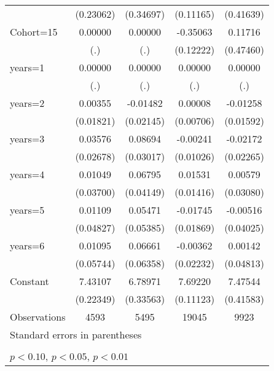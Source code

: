 \begin{table}[htbp]
\begin{tabular}{l*{4}{c}}
                    &   (0.23062)         &   (0.34697)         &   (0.11165)         &   (0.41639)         \\
\addlinespace
Cohort=15           &     0.00000         &     0.00000         &    -0.35063\sym{***}&     0.11716         \\
                    &         (.)         &         (.)         &   (0.12222)         &   (0.47460)         \\
\addlinespace
years=1             &     0.00000         &     0.00000         &     0.00000         &     0.00000         \\
                    &         (.)         &         (.)         &         (.)         &         (.)         \\
\addlinespace
years=2             &     0.00355         &    -0.01482         &     0.00008         &    -0.01258         \\
                    &   (0.01821)         &   (0.02145)         &   (0.00706)         &   (0.01592)         \\
\addlinespace
years=3             &     0.03576         &     0.08694\sym{***}&    -0.00241         &    -0.02172         \\
                    &   (0.02678)         &   (0.03017)         &   (0.01026)         &   (0.02265)         \\
\addlinespace
years=4             &     0.01049         &     0.06795         &     0.01531         &     0.00579         \\
                    &   (0.03700)         &   (0.04149)         &   (0.01416)         &   (0.03080)         \\
\addlinespace
years=5             &     0.01109         &     0.05471         &    -0.01745         &    -0.00516         \\
                    &   (0.04827)         &   (0.05385)         &   (0.01869)         &   (0.04025)         \\
\addlinespace
years=6             &     0.01095         &     0.06661         &    -0.00362         &     0.00142         \\
                    &   (0.05744)         &   (0.06358)         &   (0.02232)         &   (0.04813)         \\
\addlinespace
Constant            &     7.43107\sym{***}&     6.78971\sym{***}&     7.69220\sym{***}&     7.47544\sym{***}\\
                    &   (0.22349)         &   (0.33563)         &   (0.11123)         &   (0.41583)         \\
\midrule
Observations        &        4593         &        5495         &       19045         &        9923         \\
\bottomrule
\multicolumn{5}{l}{\footnotesize Standard errors in parentheses}\\
\multicolumn{5}{l}{\footnotesize }\\
\multicolumn{5}{l}{\footnotesize \sym{*} \(p<0.10\), \sym{**} \(p<0.05\), \sym{***} \(p<0.01\)}\\
\end{tabular}
\end{table}

